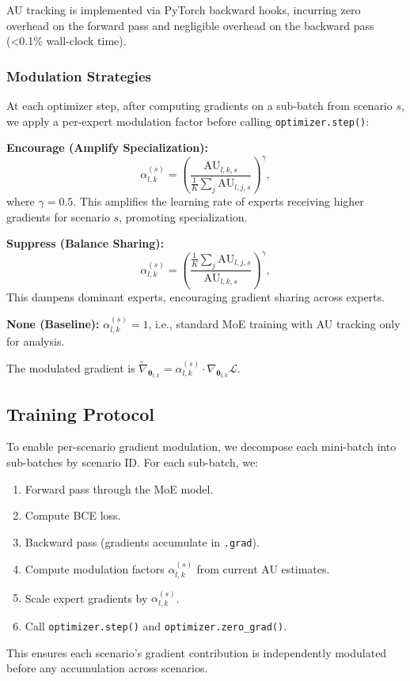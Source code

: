 \documentclass{article}
\begin{document}
AU tracking is implemented via PyTorch backward hooks, incurring zero overhead on the forward pass and negligible overhead on the backward pass (\textless 0.1\% wall-clock time).

\subsubsection{Modulation Strategies}

At each optimizer step, after computing gradients on a sub-batch from scenario $s$, we apply a per-expert modulation factor before calling \texttt{optimizer.step()}:

\textbf{Encourage (Amplify Specialization):}
\begin{equation}
    \alpha_{l,k}^{(s)} = \left(\frac{\text{AU}_{l,k,s}}{\frac{1}{K} \sum_j \text{AU}_{l,j,s}}\right)^{\gamma},
    \label{eq:encourage}
\end{equation}
where $\gamma = 0.5$. This amplifies the learning rate of experts receiving higher gradients for scenario $s$, promoting specialization.

\textbf{Suppress (Balance Sharing):}
\begin{equation}
    \alpha_{l,k}^{(s)} = \left(\frac{\frac{1}{K} \sum_j \text{AU}_{l,j,s}}{\text{AU}_{l,k,s}}\right)^{\gamma},
    \label{eq:suppress}
\end{equation}
This dampens dominant experts, encouraging gradient sharing across experts.

\textbf{None (Baseline):} $\alpha_{l,k}^{(s)} = 1$, i.e., standard MoE training with AU tracking only for analysis.

The modulated gradient is $\tilde{\nabla}_{\boldsymbol{\theta}_{l,k}} = \alpha_{l,k}^{(s)} \cdot \nabla_{\boldsymbol{\theta}_{l,k}} \mathcal{L}$.

\subsection{Training Protocol}
\label{sec:training}

To enable per-scenario gradient modulation, we decompose each mini-batch into sub-batches by scenario ID.
For each sub-batch, we:
\begin{enumerate}
    \item Forward pass through the MoE model.
    \item Compute BCE loss.
    \item Backward pass (gradients accumulate in \texttt{.grad}).
    \item Compute modulation factors $\alpha_{l,k}^{(s)}$ from current AU estimates.
    \item Scale expert gradients by $\alpha_{l,k}^{(s)}$.
    \item Call \texttt{optimizer.step()} and \texttt{optimizer.zero\_grad()}.
\end{enumerate}
This ensures each scenario's gradient contribution is independently modulated before any accumulation across scenarios.
\end{document}
